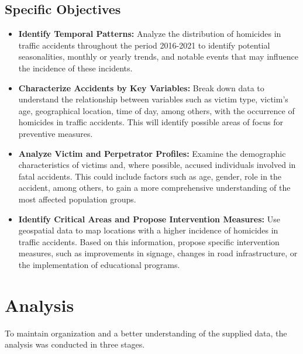 \documentclass[12pt]{article}
\begin{document}
\subsection{Specific Objectives}
\begin{itemize}
    \item \textbf{Identify Temporal Patterns:} Analyze the distribution of homicides in traffic accidents throughout the period 2016-2021 to identify potential seasonalities, monthly or yearly trends, and notable events that may influence the incidence of these incidents.
    
    \item \textbf{Characterize Accidents by Key Variables:} Break down data to understand the relationship between variables such as victim type, victim's age, geographical location, time of day, among others, with the occurrence of homicides in traffic accidents. This will identify possible areas of focus for preventive measures.
    
    \item \textbf{Analyze Victim and Perpetrator Profiles:} Examine the demographic characteristics of victims and, where possible, accused individuals involved in fatal accidents. This could include factors such as age, gender, role in the accident, among others, to gain a more comprehensive understanding of the most affected population groups.
    
    \item \textbf{Identify Critical Areas and Propose Intervention Measures:} Use geospatial data to map locations with a higher incidence of homicides in traffic accidents. Based on this information, propose specific intervention measures, such as improvements in signage, changes in road infrastructure, or the implementation of educational programs.
\end{itemize}

\section{Analysis}
To maintain organization and a better understanding of the supplied data, the analysis was conducted in three stages.
\end{document}
